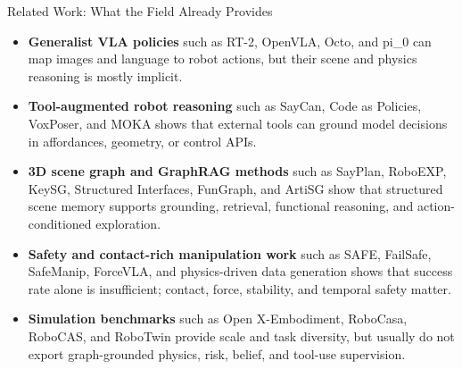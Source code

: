
\begin{frame}{Related Work: What the Field Already Provides}
\small
\begin{itemize}
\item \textbf{Generalist VLA policies} such as RT-2, OpenVLA, Octo, and pi\_0 can map images and language to robot actions, but their scene and physics reasoning is mostly implicit.
\item \textbf{Tool-augmented robot reasoning} such as SayCan, Code as Policies, VoxPoser, and MOKA shows that external tools can ground model decisions in affordances, geometry, or control APIs.
\item \textbf{3D scene graph and GraphRAG methods} such as SayPlan, RoboEXP, KeySG, Structured Interfaces, FunGraph, and ArtiSG show that structured scene memory supports grounding, retrieval, functional reasoning, and action-conditioned exploration.
\item \textbf{Safety and contact-rich manipulation work} such as SAFE, FailSafe, SafeManip, ForceVLA, and physics-driven data generation shows that success rate alone is insufficient; contact, force, stability, and temporal safety matter.
\item \textbf{Simulation benchmarks} such as Open X-Embodiment, RoboCasa, RoboCAS, and RoboTwin provide scale and task diversity, but usually do not export graph-grounded physics, risk, belief, and tool-use supervision.
\end{itemize}
\end{frame}

